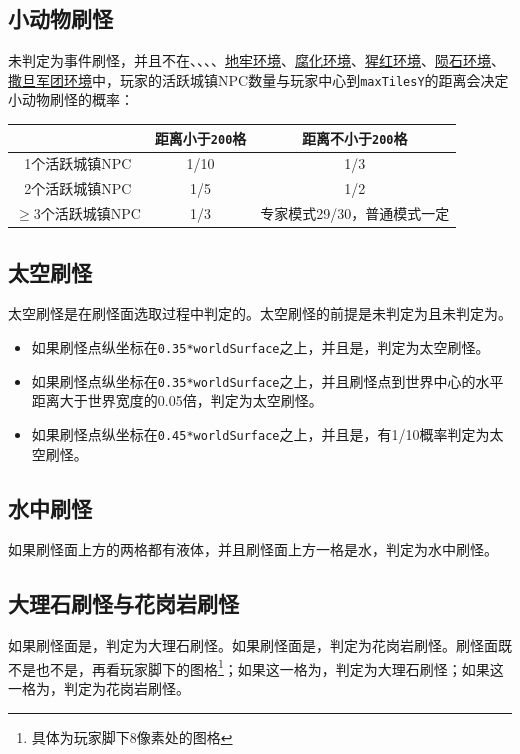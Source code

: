 \subsection{小动物刷怪}\label{app40}
未判定为事件刷怪，并且不在、、、、\hyperref[app37]{地牢环境}、\hyperref[app37]{腐化环境}、\hyperref[app37]{猩红环境}、\hyperref[app37]{陨石环境}、\hyperref[app37]{撒旦军团环境}中，玩家的活跃城镇NPC数量与玩家中心到\lstinline{maxTilesY}的距离会决定小动物刷怪的概率：
\begin{center}
\begin{tabular}{|c|c|c|}
    \hline
    &距离小于{\lstinline!200!}格&距离不小于{\lstinline!200!}格\\\hline
    1个活跃城镇NPC&1/10&1/3\\\hline
    2个活跃城镇NPC&1/5&1/2\\\hline
    $\ge$3个活跃城镇NPC&1/3&专家模式29/30，普通模式一定\\\hline
\end{tabular}
\end{center}

\subsection{太空刷怪}\label{app22}
太空刷怪是在刷怪面选取过程中判定的。太空刷怪的前提是未判定为且未判定为。
\begin{itemize}
    \item 如果刷怪点纵坐标在\lstinline{0.35*worldSurface}之上，并且是，判定为太空刷怪。
    \item 如果刷怪点纵坐标在\lstinline{0.35*worldSurface}之上，并且刷怪点到世界中心的水平距离大于世界宽度的0.05倍，判定为太空刷怪。
    \item 如果刷怪点纵坐标在\lstinline{0.45*worldSurface}之上，并且是，有1/10概率判定为太空刷怪。
\end{itemize}

\subsection{水中刷怪}
如果刷怪面上方的两格都有液体，并且刷怪面上方一格是水，判定为水中刷怪。

\subsection{大理石刷怪与花岗岩刷怪}
如果刷怪面是，判定为大理石刷怪。如果刷怪面是，判定为花岗岩刷怪。刷怪面既不是也不是，再看玩家脚下的图格\footnote{具体为玩家脚下8像素处的图格}；如果这一格为，判定为大理石刷怪；如果这一格为，判定为花岗岩刷怪。

